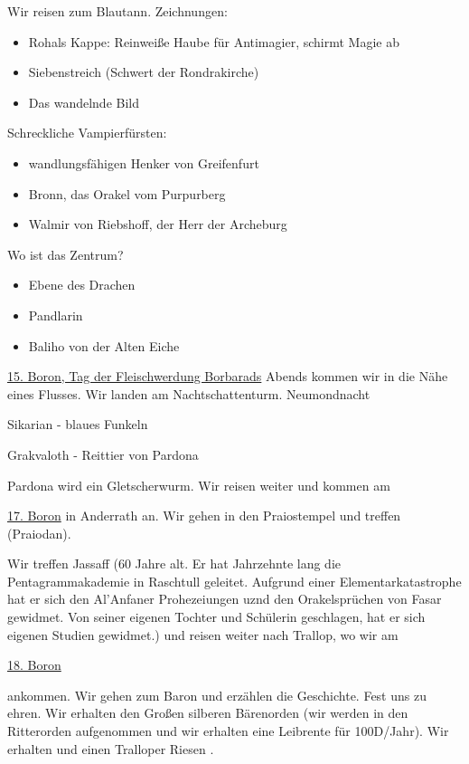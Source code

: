 Wir reisen zum Blautann.
Zeichnungen:
\begin{itemize}
\item Rohals Kappe: Reinweiße Haube für Antimagier, schirmt Magie ab 
\item Siebenstreich (Schwert der Rondrakirche)
\item Das wandelnde Bild
\end{itemize}
Schreckliche Vampierfürsten:
\begin{itemize}
\item wandlungsfähigen Henker von Greifenfurt
\item Bronn, das Orakel vom Purpurberg
\item Walmir von Riebshoff, der Herr der Archeburg 
\end{itemize}
Wo ist das Zentrum?
\begin{itemize}
\item Ebene des Drachen
\item Pandlarin 
\item Baliho von der Alten Eiche
\end{itemize}

\underline{15. Boron, Tag der Fleischwerdung Borbarads}
Abends kommen wir in die Nähe eines Flusses. Wir landen am Nachtschattenturm. Neumondnacht

Sikarian - blaues Funkeln 

Grakvaloth - Reittier von Pardona

 Pardona wird ein Gletscherwurm. Wir reisen weiter und kommen am 

\underline{17. Boron} in Anderrath an. Wir gehen in den Praiostempel und treffen (Praiodan). 

Wir treffen Jassaff (60 Jahre alt. Er hat Jahrzehnte lang die Pentagrammakademie in Raschtull geleitet. Aufgrund einer Elementarkatastrophe hat er sich den Al'Anfaner Prohezeiungen uznd den Orakelsprüchen von Fasar gewidmet. Von seiner eigenen Tochter und Schülerin geschlagen, hat er sich eigenen Studien gewidmet.) und reisen weiter nach Trallop, wo wir am

\underline{18. Boron}

ankommen. Wir gehen zum Baron und erzählen die Geschichte. Fest uns zu ehren. Wir erhalten den Großen silberen Bärenorden (wir werden in den Ritterorden aufgenommen und wir erhalten eine Leibrente für 100D/Jahr). Wir erhalten  und einen Tralloper Riesen .  


\begin{figure}[htb!]
\centering
{}
\end{figure}